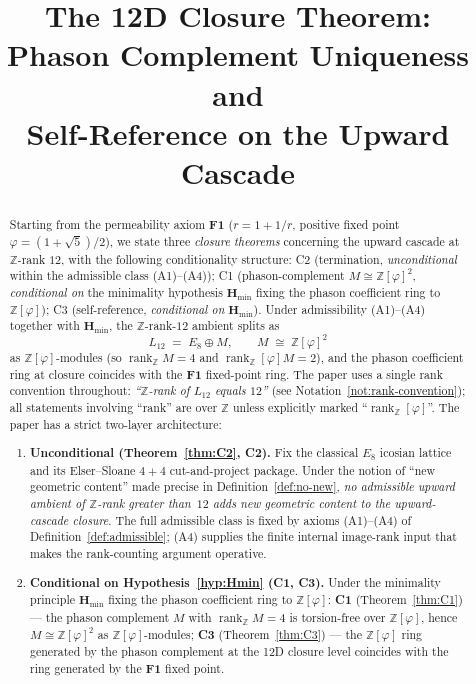 \documentclass[11pt, a4paper]{amsart}
\title{The 12D Closure Theorem:\\
  Phason Complement Uniqueness and\\
  Self-Reference on the Upward Cascade}
\author{}
\date{}
\theoremstyle{definition}
\newcommand{\Z}{\mathbb{Z}}
\newcommand{\rk}{\operatorname{rank}}
\newcommand{\Hmin}{\mathbf{H}_{\min}}
\newcommand{\Ophi}{\mathbb{Z}[\varphi]}
\begin{document}
\maketitle

\begin{abstract}
Starting from the permeability axiom $\mathbf{F1}$ ($r = 1 + 1/r$,
positive fixed point $\varphi = (1 + \sqrt{5})/2$), we state
three \emph{closure theorems} concerning the upward cascade at
$\Z$-rank $12$, with the following conditionality structure:
C2 (termination, \emph{unconditional} within the admissible
class (A1)--(A4)); C1 (phason-complement $M \cong \Ophi^{2}$,
\emph{conditional on} the minimality hypothesis $\Hmin$
fixing the phason coefficient ring to $\Ophi$); C3
(self-reference, \emph{conditional on} $\Hmin$). Under admissibility (A1)--(A4) together with $\Hmin$, the
$\Z$-rank-$12$ ambient splits as
\[
  L_{12} \;=\; E_8 \oplus M, \qquad M \;\cong\; \Ophi^{2}
\]
as $\Ophi$-modules (so $\rk_\Z M = 4$ and $\rk_\Ophi M = 2$),
and the phason coefficient ring at closure coincides with the
$\mathbf{F1}$ fixed-point ring. The paper uses a single rank convention
throughout: \emph{``$\Z$-rank of $L_{12}$ equals $12$''}
(see Notation~\ref{not:rank-convention}); all statements
involving ``rank'' are over $\Z$ unless explicitly marked
``$\rk_\Ophi$''. The paper has a strict two-layer architecture:

\begin{enumerate}
\item \textbf{Unconditional (Theorem~\ref{thm:C2}, C2).}
  Fix the classical $E_8$ icosian lattice and its
  Elser--Sloane $4+4$ cut-and-project package. Under the
  notion of ``new geometric content'' made precise in
  Definition~\ref{def:no-new}, \emph{no admissible upward
  ambient of $\Z$-rank greater than~$12$ adds new geometric
  content to the upward-cascade closure}. The full admissible
  class is fixed by axioms (A1)--(A4) of
  Definition~\ref{def:admissible}; (A4) supplies the finite
  internal image-rank input that makes the rank-counting
  argument operative.
\item \textbf{Conditional on Hypothesis~\ref{hyp:Hmin}
  (C1, C3).} Under the minimality principle $\Hmin$ fixing
  the phason coefficient ring to $\Ophi$:
  \textbf{C1} (Theorem~\ref{thm:C1}) --- the phason
  complement $M$ with $\rk_\Z M = 4$ is torsion-free over
  $\Ophi$, hence $M \cong \Ophi^{2}$ as $\Ophi$-modules;
  \textbf{C3} (Theorem~\ref{thm:C3}) --- the $\Ophi$ ring
  generated by the phason complement at the 12D closure level
  coincides with the ring generated by the $\mathbf{F1}$ fixed
  point.
\end{enumerate}


\end{abstract}
\end{document}
